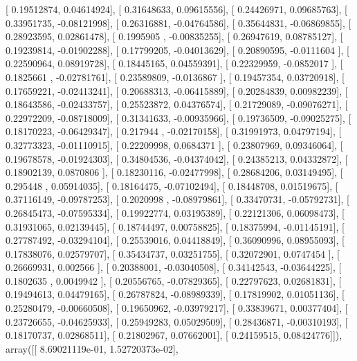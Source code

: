 \documentclass{article}
\begin{document}
       [ 0.19512874,  0.04614924],
       [ 0.31648633,  0.09615556],
       [ 0.24426971,  0.09685763],
       [ 0.33951735, -0.08121998],
       [ 0.26316881, -0.04764586],
       [ 0.35644831, -0.06869855],
       [ 0.28923595,  0.02861478],
       [ 0.1995905 , -0.00835255],
       [ 0.26947619,  0.08785127],
       [ 0.19239814, -0.01902288],
       [ 0.17799205, -0.04013629],
       [ 0.20890595, -0.0111604 ],
       [ 0.22590964,  0.08919728],
       [ 0.18445165,  0.04559391],
       [ 0.22329959, -0.0852017 ],
       [ 0.1825661 , -0.02781761],
       [ 0.23589809, -0.0136867 ],
       [ 0.19457354,  0.03720918],
       [ 0.17659221, -0.02413241],
       [ 0.20688313, -0.06415889],
       [ 0.20284839,  0.00982239],
       [ 0.18643586, -0.02433757],
       [ 0.25523872,  0.04376574],
       [ 0.21729089, -0.09076271],
       [ 0.22972209, -0.08718009],
       [ 0.31341633, -0.00935966],
       [ 0.19736509, -0.09025275],
       [ 0.18170223, -0.06429347],
       [ 0.217944  , -0.02170158],
       [ 0.31991973,  0.04797194],
       [ 0.32773323, -0.01110915],
       [ 0.22209998,  0.0684371 ],
       [ 0.23807969,  0.09346064],
       [ 0.19678578, -0.01924303],
       [ 0.34804536, -0.04374042],
       [ 0.24385213,  0.04332872],
       [ 0.18902139,  0.0870806 ],
       [ 0.18230116, -0.02477998],
       [ 0.28684206,  0.03149495],
       [ 0.295448  ,  0.05914035],
       [ 0.18164475, -0.07102494],
       [ 0.18448708,  0.01519675],
       [ 0.37116149, -0.09787253],
       [ 0.2020998 , -0.08979861],
       [ 0.33470731, -0.05792731],
       [ 0.26845473, -0.07595334],
       [ 0.19922774,  0.03195389],
       [ 0.22121306,  0.06098473],
       [ 0.31931065,  0.02139445],
       [ 0.18744497,  0.00758825],
       [ 0.18375994, -0.01145191],
       [ 0.27787492, -0.03294104],
       [ 0.25539016,  0.04418849],
       [ 0.36090996,  0.08955093],
       [ 0.17838076,  0.02579707],
       [ 0.35434737,  0.03251755],
       [ 0.32072901,  0.0747454 ],
       [ 0.26669931,  0.002566  ],
       [ 0.20388001, -0.03040508],
       [ 0.34142543, -0.03644225],
       [ 0.1802635 ,  0.0049942 ],
       [ 0.20556765, -0.07829365],
       [ 0.22797623,  0.02681831],
       [ 0.19494613,  0.04479165],
       [ 0.26787824, -0.08989339],
       [ 0.17819902,  0.01051136],
       [ 0.25280479, -0.00660508],
       [ 0.19650962, -0.03979217],
       [ 0.33839671,  0.00377404],
       [ 0.23726655, -0.04625933],
       [ 0.25949283,  0.05029509],
       [ 0.28436871, -0.00310193],
       [ 0.18170737,  0.02868511],
       [ 0.21802967,  0.07662001],
       [ 0.24159515,  0.08424776]]), array([[  8.69021119e-01,   1.52720373e-02],
\end{document}
